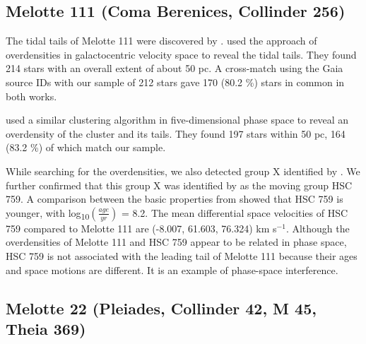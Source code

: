 \documentclass{aa}
\begin{document}
\subsection{Melotte 111 (Coma Berenices, Collinder 256)}
The tidal tails of Melotte 111 were discovered by \citet{2019A&A...624L..11Furnkranz, 2019ApJ...877...12Tang,2022ApJ...931..156Pang}. \citet{2019A&A...624L..11Furnkranz} used the approach of overdensities in galactocentric velocity space to reveal the tidal tails. They found 214 stars with an overall extent of about 50 pc. A cross-match using the Gaia source IDs with our sample of 212 stars gave 170 (80.2 \%) stars in common in both works.

\citet{2019ApJ...877...12Tang} used a similar clustering algorithm in five-dimensional phase space to reveal an overdensity of the cluster and its tails. They found 197 stars within 50 pc, 164 (83.2 \%) of which match our sample. 

While searching for the overdensities, we also detected group X identified by \citet{2019ApJ...877...12Tang}. We further confirmed that this group X was identified by  as the moving group HSC 759. A comparison between the basic properties from  showed that HSC 759 is younger, with log\textsubscript{10}$(\frac{age}{yr})$ = 8.2. The mean differential space velocities of HSC 759 compared to Melotte 111 are (-8.007, 61.603, 76.324) km s$^{-1}$. Although the overdensities of Melotte 111 and HSC 759 appear to be related in phase space, HSC 759 is not associated with the leading tail of Melotte 111 because their ages and space motions are different. It is an example of phase-space interference. 

\subsection{Melotte 22 (Pleiades, Collinder 42, M 45, Theia 369)}
\end{document}
